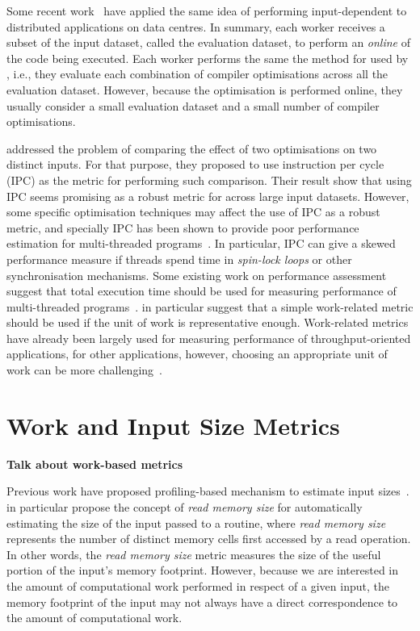 Some recent work~\citep{chen12b,fang15} have applied the same idea of performing input-dependent {\itercomp} to distributed applications on data centres.
In summary, each worker receives a subset of the input dataset, called the evaluation dataset, to perform an \textit{online} {\itercomp} of the code being executed.
Each worker performs the same the method for {\itercomp} used by \cite{chen10,chen12a}, i.e., they evaluate each combination of compiler optimisations across all the evaluation dataset.
However, because the optimisation is performed online, they usually consider a small evaluation dataset and a small number of compiler optimisations.

\cite{fursin07} addressed the problem of comparing the effect of two optimisations on two distinct inputs.
For that purpose, they proposed to use instruction per cycle (IPC) as the metric for performing such comparison.
Their result show that using IPC seems promising as a robust metric for {\itercomp} across large input datasets.
However, some specific optimisation techniques may affect the use of IPC as a robust metric, and specially IPC has been shown to provide poor performance estimation for multi-threaded programs~\citep{alameldeen06,eyerman08}.
In particular, IPC can give a skewed performance measure if threads spend time in \textit{spin-lock loops} or other synchronisation mechanisms. 
Some existing work on performance assessment suggest that total execution time should be used for measuring performance of multi-threaded programs~\citep{alameldeen06,eyerman08}.
\cite{alameldeen06} in particular suggest that a simple work-related metric should be used if the unit of work is representative enough.
Work-related metrics have already been largely used for measuring performance of throughput-oriented applications, for other applications, however, choosing an appropriate unit of work can be more challenging~\citep{alameldeen06}.

\section{Work and Input Size Metrics}

\textbf{Talk about work-based metrics}

\citep{mcgeoch07}

Previous work have proposed profiling-based mechanism to estimate input sizes~\citep{zaparanuks12,coppa14}.
\cite{coppa14} in particular propose the concept of \textit{read memory size} for automatically estimating the size of the input passed to a routine, where \textit{read memory size} represents the number of distinct memory cells first accessed by a read operation.
In other words, the \textit{read memory size} metric measures the size of the useful portion of the input's memory footprint.
However, because we are interested in the amount of computational work performed in respect of a given input, the memory footprint of the input may not always have a direct correspondence to  the amount of computational work.

